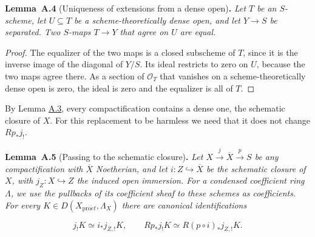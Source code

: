 \documentclass[11pt]{article}
\newenvironment{bpstatement}[2]{\par\addvspace{0.6\baselineskip}\noindent\textbf{#1}#2\textbf{.}\enspace\ignorespaces}
  {\par\addvspace{0.4\baselineskip}}
\newenvironment{bpstatementit}[2]{\begin{bpstatement}{#1}{#2}\itshape\ignorespaces}{\end{bpstatement}}
\begin{document}
\label{bp12}%
\begin{bpstatementit}{Lemma~A.4}{ (Uniqueness of extensions from a dense open)}
Let \(T\) be an \(S\)-scheme, let \(U\subseteq T\) be a scheme-theoretically dense open, and let \(Y\to S\) be separated. Two \(S\)-maps \(T\to Y\) that agree on \(U\) are equal.
\end{bpstatementit}

\begin{proof}[{Proof}]\label{bp13}%
The equalizer of the two maps is a closed subscheme of \(T\), since it is the inverse image of the diagonal of \(Y/S\). Its ideal restricts to zero on \(U\), because the two maps agree there. As a section of \(\mathcal O_T\) that vanishes on a scheme-theoretically dense open is zero, the ideal is zero and the equalizer is all of \(T\).
\end{proof}

\label{bp14}%
By Lemma \hyperref[bp9]{A.3}, every compactification contains a dense one, the schematic closure of \(X\). For this replacement to be harmless we need that it does not change \(Rp_*j_!\).

\label{bp15}%
\begin{bpstatementit}{Lemma~A.5}{ (Passing to the schematic closure)}
Let \(X\xrightarrow{j}\overline X\xrightarrow{p}S\) be any compactification with \(\overline X\) Noetherian, and let \(i:Z\hookrightarrow\overline X\) be the schematic closure of \(X\), with \(j_Z:X\hookrightarrow Z\) the induced open immersion. For a condensed coefficient ring \(\Lambda\), we use the pullbacks of its coefficient sheaf to these schemes as coefficients. For every \(K\in D(X_{\mathrm{pro}\acute{e}t},\Lambda_X)\) there are canonical identifications

\[
j_!K\simeq i_*j_{Z,!}K,\qquad
Rp_*j_!K\simeq R(p\circ i)_*j_{Z,!}K.
\]
\end{bpstatementit}
\end{document}
